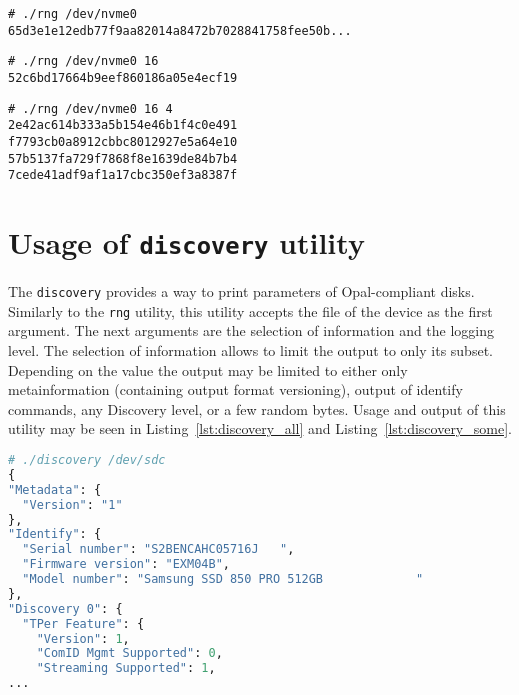 \begin{lstlisting}[caption=Execution with default arguments,label={lst:rng_def}]
# ./rng /dev/nvme0
65d3e1e12edb77f9aa82014a8472b7028841758fee50b...
\end{lstlisting}

\begin{lstlisting}[caption=Execution specifying number of bytes per session,label={lst:rng_one}]
# ./rng /dev/nvme0 16
52c6bd17664b9eef860186a05e4ecf19
\end{lstlisting}

\newpage

\begin{lstlisting}[caption=Execution specifying number of sessions,label={lst:rng_two}]
# ./rng /dev/nvme0 16 4
2e42ac614b333a5b154e46b1f4c0e491
f7793cb0a8912cbbc8012927e5a64e10
57b5137fa729f7868f8e1639de84b7b4
7cede41adf9af1a17cbc350ef3a8387f
\end{lstlisting}



\section{Usage of \texttt{discovery} utility}

The \verb|discovery| provides a way to print parameters of Opal-compliant disks. Similarly to the \verb|rng| utility, this utility accepts the file of the device as the first argument. The next arguments are the selection of information and the logging level. The selection of information allows to limit the output to only its subset. Depending on the value the output may be limited to either only metainformation (containing output format versioning), output of identify commands, any Discovery level, or a few random bytes. Usage and output of this utility may be seen in Listing~\ref{lst:discovery_all} and Listing~\ref{lst:discovery_some}.




\begin{lstlisting}[language=python,caption=Execution providing entire output,label={lst:discovery_all},commentstyle=\color{black}]
# ./discovery /dev/sdc
{
"Metadata": {
  "Version": "1"
},
"Identify": {
  "Serial number": "S2BENCAHC05716J   ",
  "Firmware version": "EXM04B",
  "Model number": "Samsung SSD 850 PRO 512GB             "
},
"Discovery 0": {
  "TPer Feature": {
    "Version": 1,
    "ComID Mgmt Supported": 0,
    "Streaming Supported": 1,
...
\end{lstlisting}
% 


